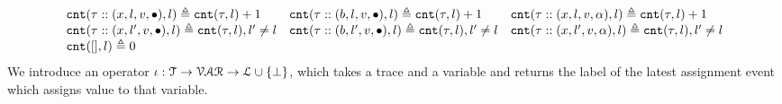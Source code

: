 \[
\begin{array}{lll}
\mathtt{cnt}(\mathtt{\tau} :: (x, l, v, \bullet), l ) \triangleq \mathtt{cnt}(\mathtt{\tau}, l) + 1
&
\mathtt{cnt}(\mathtt{\tau}  ::(b, l, v, \bullet), l) \triangleq \mathtt{cnt}(\mathtt{\tau}, l) + 1
&
\mathtt{cnt}(\mathtt{\tau}  :: (x, l, v, \alpha), l) \triangleq \mathtt{cnt}(\mathtt{\tau}, l) + 1
\\
\mathtt{cnt}(\mathtt{\tau}  :: (x, l', v, \bullet), l) \triangleq \mathtt{cnt}(\mathtt{\tau}, l), l' \neq l
&
\mathtt{cnt}(\mathtt{\tau}  :: (b, l', v, \bullet), l) \triangleq \mathtt{cnt}(\mathtt{\tau}, l), l' \neq l
&
\mathtt{cnt}(\mathtt{\tau}  :: (x, l', v, \alpha), l) \triangleq \mathtt{cnt}(\mathtt{\tau}, l), l' \neq l
\\
\mathtt{cnt}({[]}, l) \triangleq 0
&&
\end{array}
\]
%
%
We introduce an operator $\iota : \mathcal{T} \to \mathcal{VAR} \to \mathcal{L} \cup \{\bot\}$, which 
takes a trace and a variable and returns the label of the latest assignment event which assigns value to that variable.
